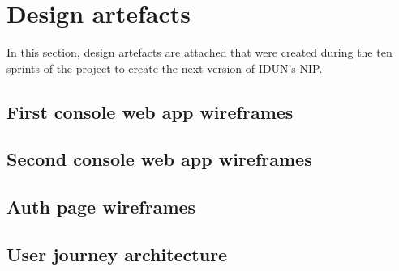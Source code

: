 \chapter{Design artefacts}
\label{appendix5-design-artefacts}

In this section, design artefacts are attached that were created during the ten sprints of the project to create the next version of IDUN's NIP.

\section*{First console web app wireframes}

\section*{Second console web app wireframes}

\section*{Auth page wireframes}

\section*{User journey architecture}
